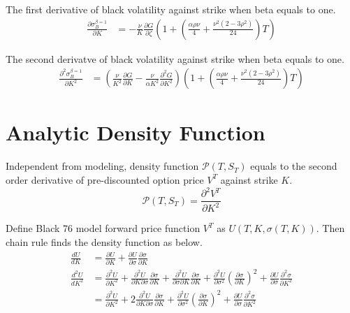 \documentclass{article}
\begin{document}
The first derivative of black volatility against strike when beta equals to one.
\begin{align} \label{dSigdK}
    \frac{\partial \sigma_{B}^{\beta=1}}{\partial K} &= -\frac{\nu}{K} \frac{\partial G}{\partial \zeta} \left(1 + \left(\frac{\alpha \rho \nu}{4} + \frac{\nu^2 \left(2 - 3 \rho^2\right)}{24}\right) T\right)
\end{align}

The second derivatve of black volatility against strike when beta equals to one.
\begin{align} \label{dSig2dK2}
    \frac{\partial^2 \sigma_{B}^{\beta=1}}{\partial K^2} &= \left(\frac{\nu}{K^2} \frac{\partial G}{\partial K} - \frac{\nu}{\alpha K^2} \frac{\partial^2 G}{\partial K^2}\right) \left(1 + \left(\frac{\alpha \rho \nu}{4} + \frac{\nu^2 \left(2 - 3 \rho^2\right)}{24}\right) T\right)
\end{align}


\section{Analytic Density Function}

Independent from modeling, density function $ \mathcal{P}\left(T, S_T\right) $ equals to the second order derivative of pre-discounted option price $ V^T $ against strike $ K $.
\begin{equation}
    \mathcal{P}\left(T, S_T\right) = \frac{\partial^2 V^T}{\partial K^2}
\end{equation}

Define Black 76 model forward price function $ V^T $ as $ U\left(T, K, \sigma(T, K)\right) $.
Then chain rule finds the density function as below.
\begin{align}
    \frac{d U}{d K} &= \frac{\partial U}{\partial K} + \frac{\partial U}{\partial \sigma} \frac{\partial \sigma}{\partial K} \\
    \frac{d^2 U}{d K^2} &= \frac{\partial^2 U}{\partial K^2} + \frac{\partial^2 U}{\partial K \partial \sigma} \frac{\partial \sigma}{\partial K}  + \frac{\partial^2 U}{\partial \sigma \partial K} \frac{\partial \sigma}{\partial K} + \frac{\partial^2 U}{\partial \sigma^2} \left(\frac{\partial \sigma}{\partial K}\right)^2 + \frac{\partial U}{\partial \sigma} \frac{\partial^2 \sigma}{\partial K^2} \nonumber \\
    &= \frac{\partial^2 U}{\partial K^2} + 2 \frac{\partial^2 U}{\partial K \partial \sigma} \frac{\partial \sigma}{\partial K} + \frac{\partial^2 U}{\partial \sigma^2} \left(\frac{\partial \sigma}{\partial K}\right)^2 + \frac{\partial U}{\partial \sigma} \frac{\partial^2 \sigma}{\partial K^2} \label{d2U_per_dK2}
\end{align}
\end{document}
